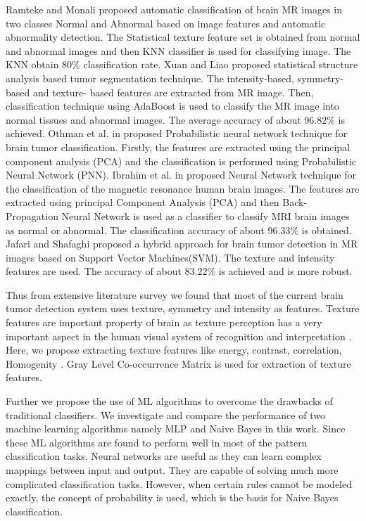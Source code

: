 	Ramteke and Monali \cite{article2} proposed automatic classification of
	brain MR images in two classes Normal and Abnormal based on image features
	and automatic abnormality detection. The Statistical texture feature set is
	obtained from normal and abnormal images and then KNN classifier is used for
	classifying image. The KNN obtain 80\% classification rate.  Xuan and Liao
	\cite{4297123} proposed statistical structure analysis based tumor
	segmentation technique. The intensity-based, symmetry-based and texture-
	based features are extracted from MR image. Then, classification technique
	using AdaBoost is used to classify the MR image into normal tissues and
	abnormal images. The average accuracy of about 96.82\% is achieved. Othman
	et al. in \cite{5730335} proposed Probabilistic neural network technique for
	brain tumor classification. Firstly, the features are extracted using the
	principal component analysis (PCA) and the classification is performed using
	Probabilistic Neural Network (PNN).  Ibrahim et al. in \cite{inproceedings2}
	proposed Neural Network technique for the classification of the magnetic
	resonance human brain images. The features are extracted using principal
	Component Analysis (PCA) and then Back- Propagation Neural Network is used
	as a classifier to classify MRI brain images as normal or abnormal. The
	classification accuracy of about 96.33\% is obtained. Jafari and Shafaghi
	\cite{article3} proposed a hybrid approach for brain tumor detection in MR
	images based on Support Vector Machines(SVM). The texture and intensity
	features are used. The accuracy of about 83.22\% is achieved and is more
	robust.

	Thus from extensive literature survey we found that most of the current
	brain tumor detection system uses texture, symmetry and intensity as
	features. Texture features are important property of brain as texture
	perception has a very important aspect in the human visual system of
	recognition and interpretation \cite{article4}. Here, we propose extracting
	texture features like energy, contrast, correlation, Homogenity
	\cite{6524466}. Gray Level Co-occurrence Matrix is used for extraction of
	texture features.

	Further we propose the use of ML algorithms to overcome the drawbacks of
	traditional classifiers. We investigate and compare the performance of two
	machine learning algorithms namely MLP and Naive Bayes in this work. Since
	these ML algorithms are found to perform well in most of the pattern
	classification tasks. Neural networks are useful as they can learn complex
	mappings between input and output. They are capable of solving much more
	complicated classification tasks. However, when certain rules cannot be
	modeled exactly, the concept of probability is used, which is the basis for
	Naive Bayes classification.
